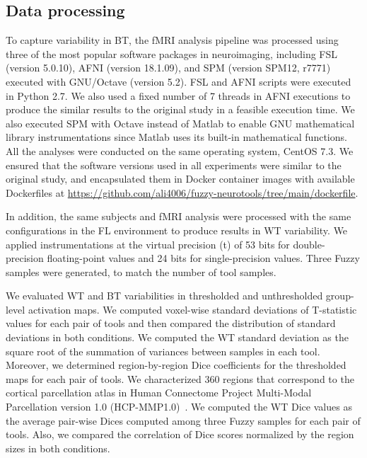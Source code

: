 \documentclass[conference]{IEEEtran}
\begin{document}
\subsection{Data processing}

To capture variability in BT, the fMRI analysis pipeline was processed using three of the most popular software
packages in neuroimaging, including FSL (version 5.0.10), AFNI (version 18.1.09), and SPM (version SPM12, r7771)
executed with GNU/Octave (version 5.2). 
FSL and AFNI scripts were executed in Python 2.7. We also used a fixed number of 7 threads in AFNI executions
to produce the similar results to the original study in a feasible execution time.
We also executed SPM with Octave instead of Matlab to enable GNU mathematical library instrumentations
since Matlab uses its built-in mathematical functions.
All the analyses were conducted on the same operating system, CentOS 7.3.
We ensured that the software versions used in all experiments were similar to the original study,
and encapsulated them in Docker container images with available Dockerfiles at \url{https://github.com/ali4006/fuzzy-neurotools/tree/main/dockerfile}.

In addition, the same subjects and fMRI analysis were processed with the same configurations in the FL environment
to produce results in WT variability.
We applied instrumentations at the virtual precision (t) of 53 bits for double-precision floating-point values
and 24 bits for single-precision values. Three Fuzzy samples were generated, to match the number of tool samples.

We evaluated WT and BT variabilities in thresholded and unthresholded group-level activation maps.
We computed voxel-wise standard deviations
 of T-statistic values for each pair of tools
and then compared the distribution of standard deviations in both conditions.
We computed the WT standard deviation as the square root of the summation of variances between samples in each tool.
Moreover, we determined region-by-region Dice coefficients for the thresholded maps for each pair of tools.
We characterized 360 regions that correspond to the cortical parcellation atlas
in Human Connectome Project Multi-Modal Parcellation version 1.0 (HCP-MMP1.0)~\cite{glasser2016multi}.
We computed the WT Dice values as the average pair-wise Dices computed among three Fuzzy samples for each pair of tools.
Also, we compared the correlation of Dice scores normalized by the region sizes in both conditions.
\end{document}
